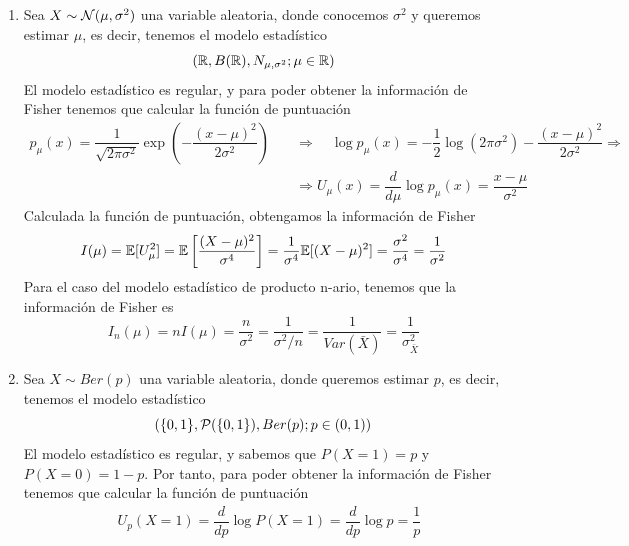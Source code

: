 \begin{ejemplo}
    \begin{enumerate}
        \item Sea $X\sim \mathcal{N}(\mu, \sigma^2)$ una variable aleatoria, donde conocemos $\sigma^2$ y queremos estimar $\mu$, es decir, tenemos el modelo estadístico
        \begin{equation*}
            (\mathbb{R}, B(\mathbb{R}), N_{\mu,\sigma^2}; \mu \in \mathbb{R})
        \end{equation*}
        El modelo estadístico es regular, y para poder obtener la información de Fisher tenemos que calcular la función de puntuación
        \begin{align*}
            p_{\mu}(x)=\dfrac{1}{\sqrt{2\pi \sigma^2}} \exp\left( -\dfrac{(x-\mu)^2}{2\sigma^2} \right) \quad &\Longrightarrow \quad \log p_{\mu}(x) = -\dfrac{1}{2} \log(2\pi \sigma^2) - \dfrac{(x-\mu)^2}{2\sigma^2}  \Longrightarrow\\
            & \Longrightarrow U_{\mu}(x) = \dfrac{d}{d\mu} \log p_{\mu}(x) = \dfrac{x-\mu}{\sigma^2}
        \end{align*}
        Calculada la función de puntuación, obtengamos la información de Fisher
        \begin{equation*}
            I(\mu)= \mathbb{E}[U_{\mu}^2]=\mathbb{E}\left[\dfrac{(X-\mu)^2}{\sigma^4}\right]=\dfrac{1}{\sigma^4}\mathbb{E}[(X-\mu)^2]=\dfrac{\sigma^2}{\sigma^4}=\dfrac{1}{\sigma^2} 
        \end{equation*}
        Para el caso del modelo estadístico de producto n-ario, tenemos que la información de Fisher es
        \begin{equation*}
            I_n(\mu) = n I(\mu) = \dfrac{n}{\sigma^2}= \dfrac{1}{\sigma^2/n}= \dfrac{1}{Var(\bar{X})}=\dfrac{1}{\sigma_{\bar{X}}^2}
        \end{equation*}
        \item Sea $X\sim Ber(p)$ una variable aleatoria, donde queremos estimar $p$, es decir, tenemos el modelo estadístico
        \begin{equation*}
            (\{0,1\}, \mathcal{P}(\{0,1\}), Ber(p); p \in (0,1))
        \end{equation*}
        El modelo estadístico es regular, y sabemos que $P(X=1)=p$ y $P(X=0)=1-p$. Por tanto, para poder obtener la información de Fisher tenemos que calcular la función de puntuación 
        \begin{align*}
            &U_p(X=1)=\dfrac{d}{dp} \log P(X=1)=\dfrac{d}{dp} \log p = \dfrac{1}{p} \\

\end{align*}
\end{enumerate}
\end{ejemplo}
